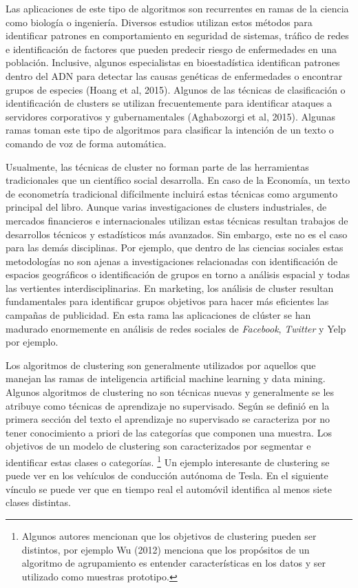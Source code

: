 \documentclass[letterpaper,12pt, spanish, oneside]{book} %
\let\oldfootnote\footnote
\renewcommand{\footnote}[1]{%
  \begingroup%
  \linespread{1.2}%
  \oldfootnote{#1}%
  \endgroup%
}
\begin{document}
Las aplicaciones de este tipo de algoritmos son recurrentes en ramas de la ciencia como biología o ingeniería. Diversos estudios utilizan estos métodos para identificar patrones en comportamiento en seguridad de sistemas, tráfico de redes e identificación de factores que pueden predecir riesgo de enfermedades en una población. Inclusive, algunos especialistas en bioestadística identifican patrones dentro del ADN para detectar las causas genéticas de enfermedades o encontrar grupos de especies (Hoang et al, 2015). Algunos de las técnicas de clasificación o identificación de clusters se utilizan frecuentemente para identificar ataques a servidores corporativos y gubernamentales (Aghabozorgi et al, 2015). Algunas ramas toman este tipo de algoritmos para clasificar la intención de un texto o comando de voz de forma automática.

Usualmente, las técnicas de cluster no forman parte de las herramientas tradicionales que un científico social desarrolla. En caso de la Economía, un texto de econometría tradicional difícilmente incluirá estas técnicas como argumento principal del libro. Aunque varias investigaciones de clusters industriales, de mercados financieros e internacionales utilizan estas técnicas resultan trabajos de desarrollos técnicos y estadísticos más avanzados. Sin embargo, este no es el caso para las demás disciplinas. Por ejemplo, que dentro de las ciencias sociales estas metodologías no son ajenas a investigaciones relacionadas con identificación de espacios geográficos o identificación de grupos en torno a análisis espacial y todas las vertientes interdisciplinarias. En marketing, los análisis de cluster resultan fundamentales para identificar grupos objetivos para hacer más eficientes las campañas de publicidad. En esta rama las aplicaciones de clúster se han madurado enormemente en análisis de redes sociales de \textit{Facebook}, \textit{Twitter} y Yelp por ejemplo.

Los algoritmos de clustering son generalmente utilizados por aquellos que manejan las ramas de inteligencia artificial machine learning y data mining. Algunos algoritmos de clustering no son técnicas nuevas y generalmente se les atribuye como técnicas de aprendizaje no supervisado. Según se definió en la primera sección del texto el aprendizaje no supervisado se caracteriza por no tener conocimiento a priori de las categorías que componen una muestra. Los objetivos de un modelo de clustering son caracterizados por segmentar e identificar estas clases o categorías.\footnote{Algunos autores mencionan que los objetivos de clustering pueden ser distintos, por ejemplo Wu (2012) menciona que los propósitos de un algoritmo de agrupamiento es entender características en los datos y ser utilizado como muestras prototipo.} Un ejemplo interesante de clustering se puede ver en los vehículos de conducción autónoma de Tesla. En el siguiente vínculo se puede ver que en tiempo real el automóvil identifica al menos siete clases distintas. 
\end{document}
